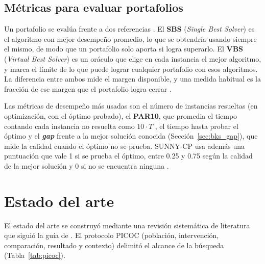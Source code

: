 \subsection{Métricas para evaluar portafolios}
\label{sec:metricas_portafolios}

Un portafolio se evalúa frente a dos referencias \citep{kerschke2019}. El
\textbf{SBS} (\textit{Single Best Solver}) es el algoritmo con mejor
desempeño promedio, lo que se obtendría usando siempre el mismo, de modo que un
portafolio solo aporta si logra superarlo. El \textbf{VBS} (\textit{Virtual
Best Solver}) es un oráculo que elige en cada instancia el mejor algoritmo, y
marca el límite de lo que puede lograr cualquier portafolio con esos
algoritmos. La diferencia entre ambos mide el margen disponible, y una medida
habitual es la fracción de ese margen que el portafolio logra cerrar
\citep{kerschke2019, lindauer2019}.

Las métricas de desempeño más usadas son el número de instancias resueltas
(en optimización, con el óptimo probado), el \textbf{PAR10}, que promedia el
tiempo contando cada instancia no resuelta como $10 \cdot T$
\citep{lindauer2019}, el tiempo hasta probar el óptimo y el
\textbf{\textit{gap}} frente a la mejor solución conocida
(Sección~\ref{sec:bks_gap}), que mide la calidad cuando el óptimo no se
prueba. SUNNY-CP usa además una puntuación que vale 1 si se prueba el óptimo,
entre 0.25 y 0.75 según la calidad de la mejor solución y 0 si no se
encuentra ninguna \citep{amadini2015sunnycp}.

\section{Estado del arte}
\label{sec:estado_arte}

El estado del arte se construyó mediante una revisión sistemática de
literatura que siguió la guía de \citet{carrera2022}. El protocolo PICOC
(población, intervención, comparación, resultado y contexto) delimitó el
alcance de la búsqueda (Tabla~\ref{tab:picoc}).

